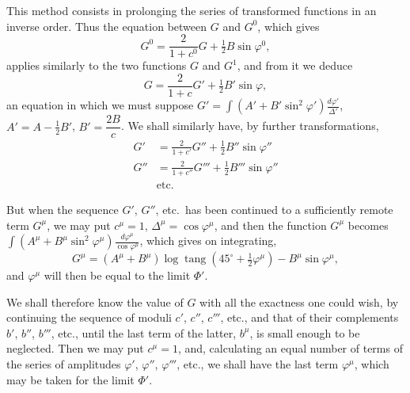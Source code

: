 \documentclass{article}
\begin{document}
This method consists in prolonging the series of transformed functions in an inverse order. Thus the equation between $G$ and $G^{0}$, which gives
\[ G^{0}=\frac{2}{1+c^{0}}G+\tfrac{1}{2}B\sin\varphi^{0}, \]
applies similarly to the two functions $G$ and $G^{1}$, and from it we deduce
\[ G=\frac{2}{1+c}G'+\tfrac{1}{2}B'\sin\varphi, \]
an equation in which we must suppose $G'=\displaystyle\int(A'+B'\sin^{2}\varphi')\frac{d\varphi'}{\Delta'}$, $A'=A-\frac{1}{2}B'$, $B'=\dfrac{2B}{c}$. We shall similarly have, by further transformations,
\[ \begin{aligned} G'&=\frac{2}{1+c'}G''+\tfrac{1}{2}B''\sin\varphi''\\ G''&=\frac{2}{1+c''}G'''+\tfrac{1}{2}B'''\sin\varphi''\\ &\text{etc.} \end{aligned} \]

But when the sequence $G'$, $G''$, etc.\ has been continued to a sufficiently remote term $G^{\mu}$, we may put $c^{\mu}=1$, $\Delta^{\mu}=\cos\varphi^{\mu}$, and then the function $G^{\mu}$ becomes $\displaystyle\int(A^{\mu}+B^{\mu}\sin^{2}\varphi^{\mu})\frac{d\varphi^{\mu}}{\cos\varphi^{\mu}}$, which gives on integrating,
\[ G^{\mu}=(A^{\mu}+B^{\mu})\log\operatorname{tang}(45^{\circ}+\tfrac{1}{2}\varphi^{\mu})-B^{\mu}\sin\varphi^{\mu}, \]
and $\varphi^{\mu}$ will then be equal to the limit $\Phi'$.

We shall therefore know the value of $G$ with all the exactness one could wish, by continuing the sequence of moduli $c'$, $c''$, $c'''$, etc., and that of their complements $b'$, $b''$, $b'''$, etc., until the last term of the latter, $b^{\mu}$, is small enough to be neglected. Then we may put $c^{\mu}=1$, and, calculating an equal number of terms of the series of amplitudes $\varphi'$, $\varphi''$, $\varphi'''$, etc., we shall have the last term $\varphi^{\mu}$, which may be taken for the limit $\Phi'$.
\end{document}
